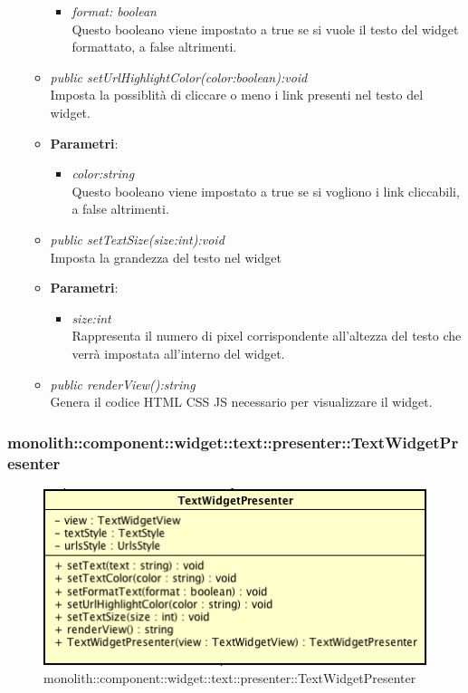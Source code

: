 \begin{itemize}
\begin{itemize}
{\begin{itemize}
		\item \textit{format: boolean}\\
		Questo booleano viene impostato a true se si vuole il testo del widget formattato, a false altrimenti.
		\end{itemize}}
	\item \textit{public setUrlHighlightColor(color:boolean):void}\\
	Imposta la possiblità di cliccare o meno i link presenti nel testo del widget.
		\item{\textbf{Parametri}: \begin{itemize}
		\item \textit{color:string}\\
		Questo booleano viene impostato a true se si vogliono i link cliccabili, a false altrimenti.
		\end{itemize}}
	\item \textit{public setTextSize(size:int):void}\\
	Imposta la grandezza del testo nel widget
		\item{\textbf{Parametri}: \begin{itemize}
		\item \textit{size:int}\\
		Rappresenta il numero di pixel corrispondente all'altezza del testo che verrà impostata all'interno del widget.
		\end{itemize}}
	\item \textit{public renderView():string}\\
	Genera il codice HTML CSS JS necessario per visualizzare il widget.
	\end{itemize}
\end{itemize}

\subsubsection{monolith::component::widget::text::presenter::TextWidgetPresenter}

\label{monolith::component::widget::text::presenter::TextWidgetPresenter}
\begin{figure}[ht]
	\centering
	\includegraphics[scale=0.5]{Sezioni/SottosezioniST/img/TextWidgetPresenter.png}
	\caption{monolith::component::widget::text::presenter::TextWidgetPresenter}
\end{figure}

